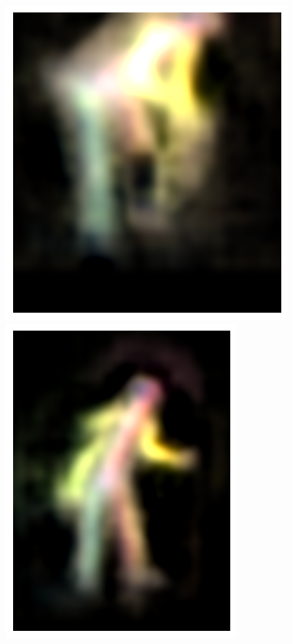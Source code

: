 \begin{figure}[t!]
    \includegraphics[height=\flowhh]{resources/Human_Poses/qualitative/svs-6}
    \hfill
    \includegraphics[height=\flowhh]{resources/Human_Poses/qualitative/svs-7}
    \hfill

\end{figure}
